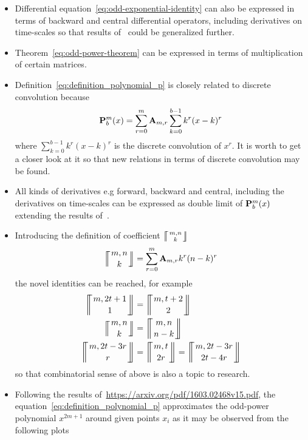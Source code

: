 \begin{itemize}
    \item Differential equation~\eqref{eq:odd-exponential-identity} can also be expressed in terms of backward
    and central differential operators, including derivatives on time-scales so that results of~\cite{kolosov2016study}
    could be generalized further.
    \item Theorem~\eqref{eq:odd-power-theorem} can be expressed in terms of multiplication of certain matrices.
    \item Definition~\eqref{eq:definition_polynomial_p} is closely related to discrete convolution because
    \begin{equation*}
        {\mathbf{P}}\sp{m} \sb{b}(x) = \sum_{r=0}^{m} {\mathbf{A}} \sb{m,r} \sum_{k=0}^{b-1} k^r(x-k)^r
    \end{equation*}
    where $\sum_{k=0}^{b-1} k^r(x-k)^r$ is the discrete convolution of $x^r$.
    It is worth to get a closer look at it so that new relations in terms of discrete convolution may be found.
    \item All kinds of derivatives e.g forward, backward and central, including the derivatives on time-scales can be expressed
    as double limit of ${\mathbf{P}}\sp{m} \sb{b}(x)$ extending the results of~\cite{kolosov_2024_10575485}.
    \item Introducing the definition of coefficient $\llceilCoefficient{m,n}{k}$
    \begin{equation*}
        \llceilCoefficient{m,n}{k} = \sum_{r=0}^{m} \coeffA{m}{r} k^r (n-k)^r
    \end{equation*}
    the novel identities can be reached, for example
    \begin{align*}
        \llceilCoefficient{m, 2t+1}{1} &= \llceilCoefficient{m, t+2}{2} \\
        \llceilCoefficient{m, n}{k} &= \llceilCoefficient{m, n}{n-k} \\
        \llceilCoefficient{m, 2t-3r}{r} &= \llceilCoefficient{m, t}{2r} = \llceilCoefficient{m, 2t-3r}{2t-4r}
    \end{align*}
    so that combinatorial sense of above is also a topic to research.
    \item Following the results of~\url{https://arxiv.org/pdf/1603.02468v15.pdf},
    the equation~\eqref{eq:definition_polynomial_p} approximates the odd-power polynomial $x^{2m+1}$ around given points
    $x_i$ as it may be observed from the following plots
    \begin{figure}[H]
        \centering

\end{figure}
\end{itemize}
